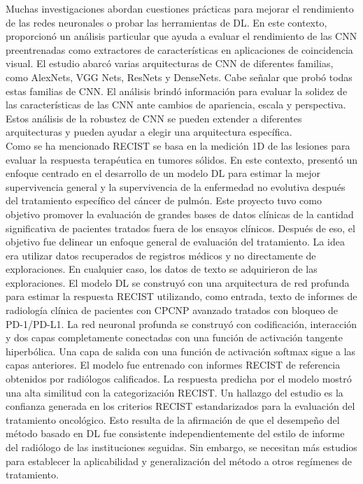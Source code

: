 \documentclass[11pt,a4paper,openany]{article}
\begin{document}
        Muchas investigaciones abordan cuestiones prácticas para mejorar el rendimiento de las redes neuronales o probar las herramientas de DL. En este contexto, \cite{holliday_pre-trained_2020} proporcionó un análisis particular que ayuda a evaluar el rendimiento de las CNN preentrenadas como extractores de características en aplicaciones de coincidencia visual. El estudio abarcó varias arquitecturas de CNN de diferentes familias, como AlexNets, VGG Nets, ResNets y DenseNets. Cabe señalar que \cite{Chang2022} probó todas estas familias de CNN. El análisis brindó información para evaluar la solidez de las características de las CNN ante cambios de apariencia, escala y perspectiva. Estos análisis de la robustez de CNN se pueden extender a diferentes arquitecturas y pueden ayudar a elegir una arquitectura específica. \\

        Como se ha mencionado RECIST se basa en la medición 1D de las lesiones para evaluar la respuesta terapéutica en tumores sólidos. En este contexto, \cite{Arbour2021} presentó un enfoque centrado en el desarrollo de un modelo DL para estimar la mejor supervivencia general y la supervivencia de la enfermedad no evolutiva después del tratamiento específico del cáncer de pulmón. Este proyecto tuvo como objetivo promover la evaluación de grandes bases de datos clínicas de la cantidad significativa de pacientes tratados fuera de los ensayos clínicos. Después de eso, el objetivo fue delinear un enfoque general de evaluación del tratamiento. La idea era utilizar datos recuperados de registros médicos y no directamente de exploraciones. En cualquier caso, los datos de texto se adquirieron de las exploraciones. El modelo DL se construyó con una arquitectura de red profunda para estimar la respuesta RECIST utilizando, como entrada, texto de informes de radiología clínica de pacientes con CPCNP avanzado tratados con bloqueo de PD-1/PD-L1. La red neuronal profunda se construyó con codificación, interacción y dos capas completamente conectadas con una función de activación tangente hiperbólica. Una capa de salida con una función de activación softmax sigue a las capas anteriores. El modelo fue entrenado con informes RECIST de referencia obtenidos por radiólogos calificados. La respuesta predicha por el modelo mostró una alta similitud con la categorización RECIST. Un hallazgo del estudio es la confianza generada en los criterios RECIST estandarizados para la evaluación del tratamiento oncológico. Esto resulta de la afirmación de que el desempeño del método basado en DL fue consistente independientemente del estilo de informe del radiólogo de las instituciones seguidas. Sin embargo, se necesitan más estudios para establecer la aplicabilidad y generalización del método a otros regímenes de tratamiento. \\
\end{document}
